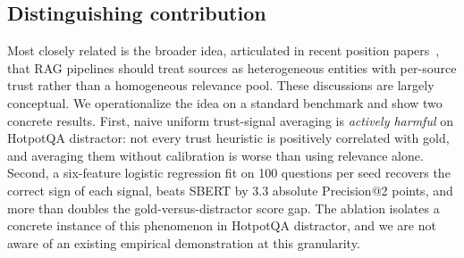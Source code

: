 \subsection{Distinguishing contribution}

Most closely related is the broader idea, articulated in recent
position papers~\cite{wu2024retrieval,ram2023incontextrag}, that RAG
pipelines should treat sources as heterogeneous entities with
per-source trust rather than a homogeneous relevance pool. These
discussions are largely conceptual. We operationalize the idea on a
standard benchmark and show two concrete results. First, naive uniform
trust-signal averaging is \emph{actively harmful} on HotpotQA
distractor: not every trust heuristic is positively correlated with
gold, and averaging them without calibration is worse than using
relevance alone. Second, a six-feature logistic regression fit on 100
questions per seed recovers the correct sign of each signal, beats
SBERT by 3.3 absolute Precision@2 points, and more than doubles the
gold-versus-distractor score gap. The ablation isolates a concrete
instance of this phenomenon in HotpotQA distractor, and we are not
aware of an existing empirical demonstration at this granularity.
